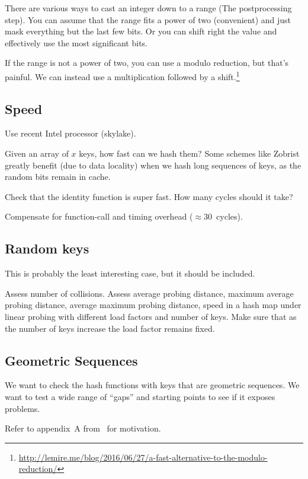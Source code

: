 \documentclass{article}
\begin{document}
There are various ways to cast an integer down to a range (The postprocessing step). You can assume that the range fits a power of two (convenient) and just mask everything but the last few bits. Or you can shift right the value and effectively use the most significant bits.

If the range is not a power of two, you can use a modulo reduction, but that's painful.  We can instead use a multiplication followed by a shift.\footnote{\url{http://lemire.me/blog/2016/06/27/a-fast-alternative-to-the-modulo-reduction/}} 

\subsection{Speed}

Use recent Intel processor (skylake).

Given an array of $x$ keys, how fast can we hash them? Some schemes like Zobrist greatly benefit (due to data locality) when we hash long sequences of keys, as the random bits remain in cache.

Check that the identity function is super fast. How many cycles should it take?

Compensate for function-call and timing overhead ($\approx 30$~cycles).

\subsection{Random keys}

This is probably the least interesting case, but it should be included.

Assess number of collisions.
Assess average probing distance, 
maximum average probing distance, 
average maximum probing distance, 
speed in a hash map under linear probing with different load factors and number of keys. Make sure that as the number of keys increase the load factor remains fixed.

\subsection{Geometric Sequences}

We want to check the hash functions with keys that are geometric sequences. We want to test a wide range of ``gaps'' and starting points to see if it exposes problems. 

Refer to appendix~A from~\cite{Patrascu:2012:PST:2220357.2220361} for motivation.
\end{document}
